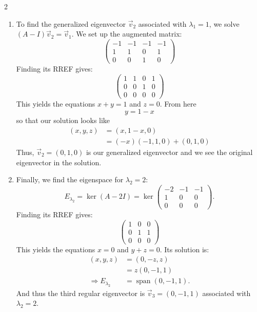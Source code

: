 \documentclass[12pt]{article}
\newcommand{\threebythree}[9]{\begin{pmatrix} %
  #1 & #2 & #3 \\ #4 & #5 & #6 \\ #7 & #8 & #9 \end{pmatrix}}
\newcommand{\To}{\Rightarrow}
\begin{document}
\begin{multicols}{2}
\begin{enumerate}
  \item To find the generalized eigenvector \(\vec{v}_2\) associated with \(\lambda_1=1\), we solve \((A-I)\vec{v}_2 = \vec{v}_1\). We set up the augmented matrix:
  \[\left(\begin{array}{ccc|c} -1 & -1 & -1 & -1 \\ 1 & 1 & 0 & 1 \\ 0 & 0 & 1 & 0 \end{array}\right)\]
  Finding its RREF gives:
  \[\left(\begin{array}{ccc|c} 1 & 1 & 0 & 1 \\ 0 & 0 & 1 & 0 \\ 0 & 0 & 0 & 0 \end{array}\right)\]
  This yields the equations \(x+y=1\) and \(z=0\). From here
  \[
  y=1-x
  \]
  so that our solution looks like
  \begin{align*}
    (x,y,z) &= (x, 1-x, 0) \\
   &=(-x)(-1,1,0)+(0,1,0)
  \end{align*}
  Thus, \(\vec{v}_2=(0,1,0)\) is our generalized eigenvector and we see the original eigenvector in the solution.
  
  \item Finally, we find the eigenspace for \(\lambda_2=2\):
  \[E_{\lambda_2}=\ker(A-2I)=\ker\threebythree{-2}{-1}{-1}{1}{0}{0}{0}{0}{0}.\]
  Finding its RREF gives:
  \[\threebythree{1}{0}{0}{0}{1}{1}{0}{0}{0}\]
  This yields the equations \(x=0\) and \(y+z=0\). Its solution is:
  \begin{align*}
    (x,y,z) &= (0, -z, z) \\
    &= z(0, -1, 1) \\
    \To E_{\lambda_2} &= \operatorname{span}(0, -1, 1).
  \end{align*}
  And thus the third regular eigenvector is \(\vec{v}_3=(0,-1,1)\) associated with \(\lambda_2=2\).
  \vfill\null\columnbreak
\end{enumerate}
\vfill\null
\end{multicols}
\end{document}
